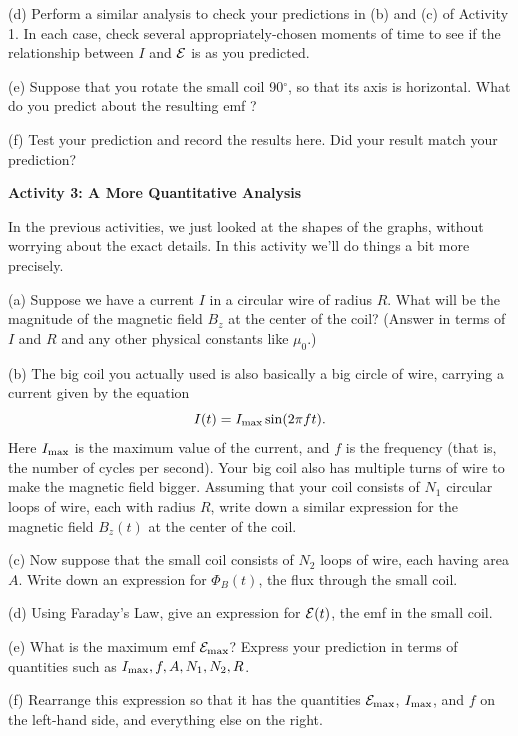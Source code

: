 \answerspace{1in}

(d) Perform a similar analysis to check your predictions in (b) and (c) of Activity 1.
In each case, check several appropriately-chosen moments of time to see
if the relationship between $I$ and ${\cal E}$ is as you predicted.

\answerspace{1in}

(e) Suppose that you rotate the small coil 90$^\circ$, so that its axis
is horizontal.  What do you predict about the resulting emf ?
\answerspace{0.8in}

(f) Test your prediction and record the results here.  Did your result match your prediction?
\answerspace{0.8in}

\pagebreak[2]

\textbf{Activity 3: A More Quantitative Analysis}

In the previous activities, we just looked at the shapes of the graphs, without worrying
about the exact details.  In this activity we'll do things a bit more precisely.

(a) Suppose we have a current $I$ in a circular wire of radius $R$.  What will be the magnitude of the magnetic field $B_z$ at the center of the coil? (Answer in terms of $I$ and $R$ and any other physical constants like $\mu_0$.)
\answerspace{1.2in}

(b) The big coil you actually used is also basically a big circle of wire, carrying a current given by the equation
$$
I(t)=I_{\rm max}\sin(2\pi f t).
$$
Here $I_{\rm max}$ is the maximum value of the current, and
$f$ is the frequency (that is, the number of cycles per second).  
Your big coil also has multiple turns of wire to make the magnetic field bigger.
Assuming that your coil consists of $N_1$ circular loops of
wire, each with radius $R$, write down a similar expression for
the magnetic field $B_z(t)$ at the center of the coil.
\answerspace{0.8in}

(c) Now suppose that the small coil consists of $N_2$ loops of wire,
each having area $A$.  Write down an expression for $\Phi_B(t)$, the
flux through the small coil.
\answerspace{0.8in}

(d) Using Faraday's Law, give an expression for ${\cal E}(t)$, the emf in
the small coil.
\answerspace{0.8in}

(e) What is the maximum emf ${\cal E}_{\rm max}$?  Express your prediction
in terms of quantities such as $I_{\rm max},f,A,N_1,N_2,R$.
\answerspace{0.8in}

(f) Rearrange this expression so that it has the quantities ${\cal E}_{\rm max}$,
$I_{\rm max}$, and $f$ on the left-hand side, and everything else on the right.
\answerspace{0.8in}


